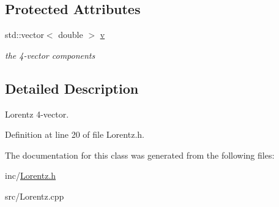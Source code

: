 \subsection*{Protected Attributes}
\begin{DoxyCompactItemize}
\item 
\hypertarget{classFV_a3bd5ca0ce4ba350f0c2a177f196419df}{}std\+::vector$<$ double $>$ \hyperlink{classFV_a3bd5ca0ce4ba350f0c2a177f196419df}{v}\label{classFV_a3bd5ca0ce4ba350f0c2a177f196419df}

\begin{DoxyCompactList}\small\item\em the 4-\/vector components \end{DoxyCompactList}\end{DoxyCompactItemize}


\subsection{Detailed Description}
Lorentz 4-\/vector. 

Definition at line 20 of file Lorentz.\+h.



The documentation for this class was generated from the following files\+:\begin{DoxyCompactItemize}
\item 
inc/\hyperlink{Lorentz_8h}{Lorentz.\+h}\item 
src/Lorentz.\+cpp\end{DoxyCompactItemize}
